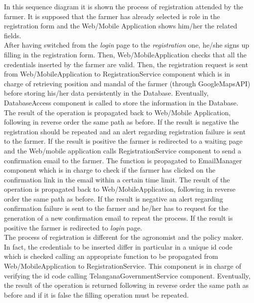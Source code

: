 In this sequence diagram it is shown the process of registration attended by the farmer. It is supposed that the farmer has already selected is role in the registration form and the Web/Mobile Application shows him/her the related fields.\\ 
After having switched from the \textit{login} page to the \textit{registration} one, he/she signs up filling in the registration form. Then, Web/MobileApplication checks that all the credentials inserted by the farmer are valid. Then, the registration request is sent from Web/MobileApplication to RegistrationService component which is in charge of retrieving position and mandal of the farmer (through GoogleMapsAPI) before storing his/her data persistently in the Database. Eventually, DatabaseAccess component is called to store the information in the Database. The result of the operation is propagated back to Web/Mobile Application, following in reverse order the same path as before. If the result is negative the registration should be repeated and an alert regarding registration failure is sent to the farmer. If the result is positive the farmer is redirected to a waiting page and the Web/mobile application calls RegistrationService component to send a confirmation email to the farmer. The function is propagated to EmailManager component which is in charge to check if the farmer has clicked on the confirmation link in the email within a certain time limit. The result of the operation is propagated back to Web/MobileApplication, following in reverse order the same path as before. If the result is negative an alert regarding confirmation failure is sent to the farmer and he/her has to request for the generation of a new confirmation email to repeat the process. If the result is positive the farmer is redirected to \textit{login} page.\\
The process of registration is different for the agronomist and the policy maker. In fact, the credentials to be inserted differ in particular in a unique id code which is checked calling an appropriate function to be propagated from Web/MobileApplication to RegistrationService. This component is in charge of verifying the id code calling TelanganaGovernmentService component. Eventually, the result of the operation is returned following in reverse order the same path as before and if it is false the filling operation must be repeated. 

